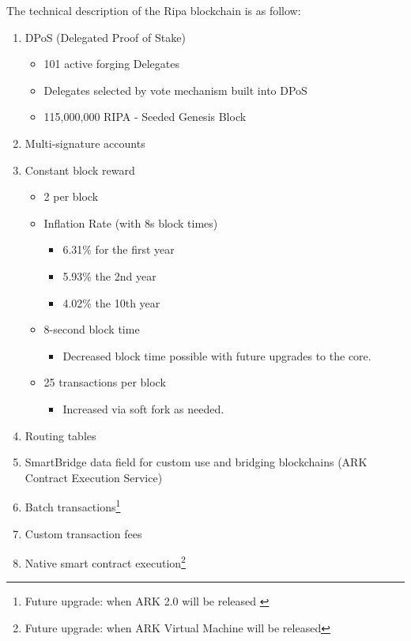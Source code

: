 \documentclass[11pt,fleqn,oneside]{book} %
\begin{document}
The technical description of the Ripa blockchain is as follow:
\begin{enumerate}
	\item DPoS (Delegated Proof of Stake)
	\begin{itemize}
		\item 101 active forging Delegates
		\item Delegates selected by vote mechanism built into DPoS
		\item 115,000,000 RIPA - Seeded Genesis Block
	\end{itemize}
	\item Multi-signature accounts
	\item Constant block reward
	\begin{itemize}
		\item 2 \PHP per block
		\item Inflation Rate (with 8s block times)
		\begin{itemize}
			\item 6.31\% for the first year
			\item 5.93\% the 2nd year
			\item 4.02\% the 10th year
		\end{itemize}
		\item 8-second block time
		\begin{itemize}
			\item Decreased block time possible with future upgrades to the core.
		\end{itemize}
		\item 25 transactions per block
		\begin{itemize}
			\item Increased via soft fork as needed.
		\end{itemize}
	\end{itemize}
	\item Routing tables
	\item SmartBridge data field for custom use and bridging blockchains (ARK Contract Execution Service)
	\item Batch transactions\footnote{Future upgrade: when ARK 2.0 will be released \label{note1}}
	\item Custom transaction fees\footnotemark[\value{footnote}]
	\item Native smart contract execution\footnote{Future upgrade: when ARK Virtual Machine will be released}
\end{enumerate}
\end{document}

